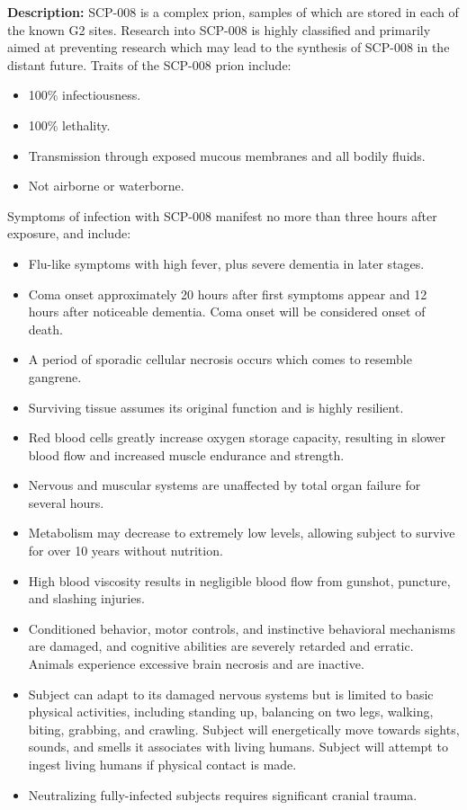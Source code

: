 \textbf{Description:} SCP-008 is a complex prion, samples of which are stored in each of the known G2 sites. Research into SCP-008 is highly classified and primarily aimed at preventing research which may lead to the synthesis of SCP-008 in the distant future. Traits of the SCP-008 prion include:

\begin{itemize}
\item 100\% infectiousness.
\item 100\% lethality.
\item Transmission through exposed mucous membranes and all bodily fluids.
\item Not airborne or waterborne.
\end{itemize}
Symptoms of infection with SCP-008 manifest no more than three hours after exposure, and include:
\begin{itemize}
\item Flu-like symptoms with high fever, plus severe dementia in later stages.
\item Coma onset approximately 20 hours after first symptoms appear and 12 hours after noticeable dementia. Coma onset will be considered onset of death.
\item A period of sporadic cellular necrosis occurs which comes to resemble gangrene. \item Surviving tissue assumes its original function and is highly resilient.
\item Red blood cells greatly increase oxygen storage capacity, resulting in slower blood flow and increased muscle endurance and strength.
\item Nervous and muscular systems are unaffected by total organ failure for several hours.
\item Metabolism may decrease to extremely low levels, allowing subject to survive for over 10 years without nutrition.
\item High blood viscosity results in negligible blood flow from gunshot, puncture, and slashing injuries.
\item Conditioned behavior, motor controls, and instinctive behavioral mechanisms are damaged, and cognitive abilities are severely retarded and erratic. Animals experience excessive brain necrosis and are inactive.
\item Subject can adapt to its damaged nervous systems but is limited to basic physical activities, including standing up, balancing on two legs, walking, biting, grabbing, and crawling. Subject will energetically move towards sights, sounds, and smells it associates with living humans. Subject will attempt to ingest living humans if physical contact is made.
\item Neutralizing fully-infected subjects requires significant cranial trauma.
\end{itemize}
